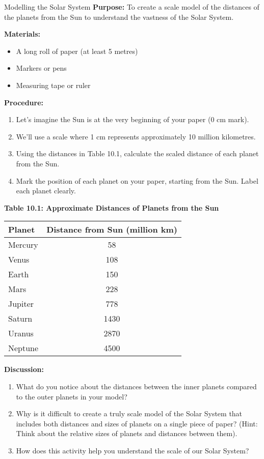 \begin{investigation}{Modelling the Solar System}
\textbf{Purpose:} To create a scale model of the distances of the planets from the Sun to understand the vastness of the Solar System.

\textbf{Materials:}
\begin{itemize}
    \item A long roll of paper (at least 5 metres)
    \item Markers or pens
    \item Measuring tape or ruler
\end{itemize}

\textbf{Procedure:}
\begin{enumerate}
    \item Let’s imagine the Sun is at the very beginning of your paper (0 cm mark).
    \item We'll use a scale where 1 cm represents approximately 10 million kilometres.
    \item Using the distances in Table 10.1, calculate the scaled distance of each planet from the Sun.
    \item Mark the position of each planet on your paper, starting from the Sun. Label each planet clearly.
\end{enumerate}

\textbf{Table 10.1: Approximate Distances of Planets from the Sun}
\begin{center}
\begin{tabular}{lc}
\textbf{Planet} & \textbf{Distance from Sun (million km)} \\
\hline
Mercury & 58 \\
Venus & 108 \\
Earth & 150 \\
Mars & 228 \\
Jupiter & 778 \\
Saturn & 1430 \\
Uranus & 2870 \\
Neptune & 4500 \\
\end{tabular}
\end{center}

\textbf{Discussion:}
\begin{enumerate}
    \item What do you notice about the distances between the inner planets compared to the outer planets in your model?
    \item Why is it difficult to create a truly scale model of the Solar System that includes both distances and sizes of planets on a single piece of paper? (Hint: Think about the relative sizes of planets and distances between them).
    \item How does this activity help you understand the scale of our Solar System?
\end{enumerate}
\end{investigation}


